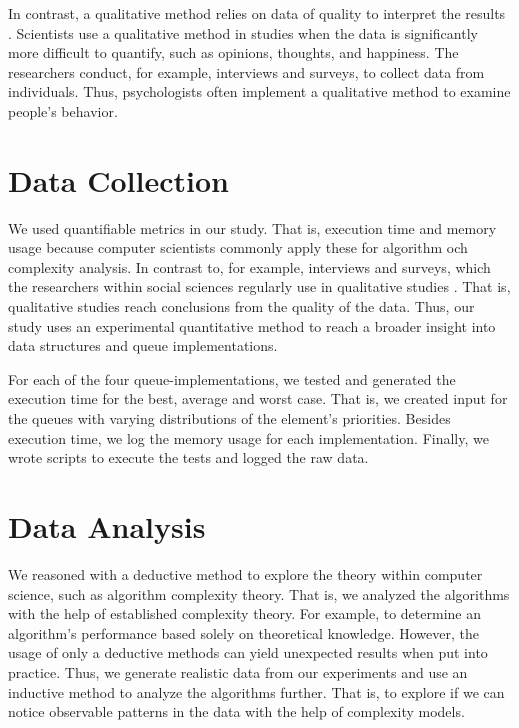 \documentclass[a4paper,11pt]{kth-mag}
\newcommand*{\skippara}{\par\vspace{\baselineskip} \noindent}
\begin{document}
\skippara In contrast, a qualitative method relies on data of quality to interpret the results \cite{merriam2009qualitative}.
Scientists use a qualitative method in studies when the data is significantly more difficult to quantify, such as opinions, thoughts, and happiness.
The researchers conduct, for example, interviews and surveys, to collect data from individuals.
Thus, psychologists often implement a qualitative method to examine people's behavior.

\section{Data Collection}
We used quantifiable metrics in our study.
That is, execution time and memory usage because computer scientists commonly apply these for algorithm och complexity analysis.
In contrast to, for example, interviews and surveys, which the researchers within social sciences regularly use in qualitative studies \cite{Omexperi69:online, haakansson2013portal}.
That is, qualitative studies reach conclusions from the quality of the data.
Thus, our study uses an experimental quantitative method to reach a broader insight into data structures and queue implementations.

\skippara For each of the four queue-implementations, we tested and generated the execution time for the best, average and worst case.
That is, we created input for the queues with varying distributions of the element's priorities.
Besides execution time, we log the memory usage for each implementation.
Finally, we wrote scripts to execute the tests and logged the raw data.

\section{Data Analysis}
We reasoned with a deductive method to explore the theory within computer science, such as algorithm complexity theory.
That is, we analyzed the algorithms with the help of established complexity theory.
For example, to determine an algorithm's performance based solely on theoretical knowledge.
However, the usage of only a deductive methods can yield unexpected results when put into practice.
Thus, we generate realistic data from our experiments and use an inductive method to analyze the algorithms further.
That is, to explore if we can notice observable patterns in the data with the help of complexity models.
\end{document}
